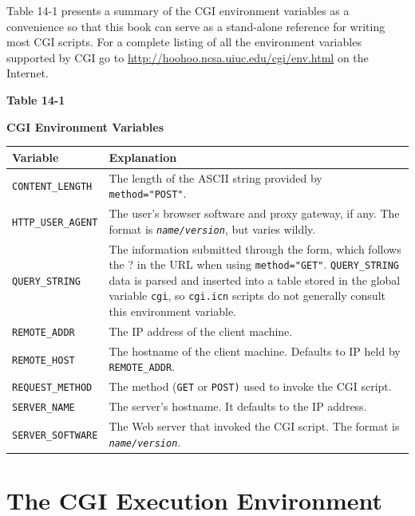 {

Table 14-1 presents a summary of the CGI environment variables as a
convenience so that this book can serve as a stand-alone reference for
writing most CGI scripts. For a complete listing of all the environment
variables supported by CGI go to
\url{http://hoohoo.ncsa.uiuc.edu/cgi/env.html} on the Internet.

{\centering\sffamily\bfseries Table 14-1}

{\centering\sffamily\bfseries CGI Environment Variables}

\begin{flushleft}
\tablehead{}
\begin{xtabular}{|m{1.65in}|m{4.15in}|}
\hline
\sffamily\bfseries Variable &
\sffamily\bfseries Explanation\\\hline
\texttt{CONTENT\_LENGTH} &
The length of the ASCII string provided by
\texttt{method="POST"}.\\\hline
\texttt{HTTP\_USER\_AGENT} &
The user's browser software and proxy gateway, if any.
The format is \texttt{\textit{name/version}}, but varies
wildly.\\\hline
\texttt{QUERY\_STRING} &
The information submitted through the form, which follows the ? in the
URL when using \texttt{method="GET"}.
\texttt{QUERY\_STRING} data is parsed and inserted into a table
stored in the global variable \texttt{cgi}, so
\texttt{cgi.icn} scripts do not generally consult this environment
variable.\\\hline
\texttt{REMOTE\_ADDR} &
The IP address of the client machine.\\\hline
\texttt{REMOTE\_HOST} &
The hostname of the client machine. Defaults to IP held by
\texttt{REMOTE\_ADDR}.\\\hline
\texttt{REQUEST\_METHOD} &
The method (\texttt{GET} or \texttt{POST)} used to invoke the CGI
script.\\\hline
\texttt{SERVER\_NAME} &
The server's hostname. It defaults to the IP
address.\\\hline
\texttt{SERVER\_SOFTWARE} &
The Web server that invoked the CGI script. The format is
\texttt{\textit{name/version}}.\\\hline
\end{xtabular}
\end{flushleft}

\section{The CGI Execution Environment}

}
